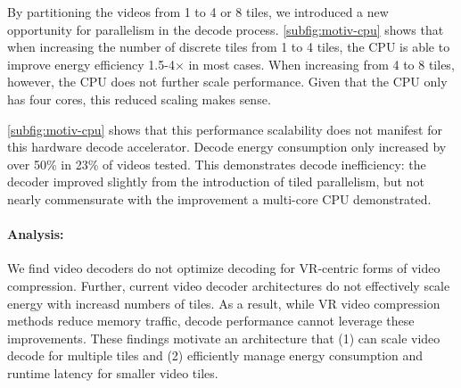 By partitioning the videos from 1 to 4 or 8 tiles, we introduced a new opportunity for parallelism in the decode process.
\ref{subfig:motiv-cpu} shows that when increasing the number of discrete tiles from 1 to 4 tiles, the CPU is able to improve energy efficiency 1.5-4$\times$ in most cases.
When increasing from 4 to 8 tiles, however, the CPU does not further scale performance.
Given that the CPU only has four cores, this reduced scaling makes sense.


%
%
\ref{subfig:motiv-cpu} shows that this performance scalability does not manifest for this hardware decode accelerator.
Decode energy consumption only increased by over 50\% in 23\% of videos tested.
This demonstrates decode inefficiency: the decoder improved slightly from the introduction of tiled parallelism, but not nearly commensurate with the improvement a multi-core CPU demonstrated.

\paragraph{Analysis: } We find video decoders do not optimize decoding for VR-centric forms of video compression.
Further, current video decoder architectures do not effectively scale energy with increasd numbers of tiles.
As a result, while VR video compression methods reduce memory traffic, decode performance cannot leverage these improvements.
These findings motivate an architecture that (1) can scale video decode for multiple tiles and (2) efficiently manage energy consumption and runtime latency for smaller video tiles.
